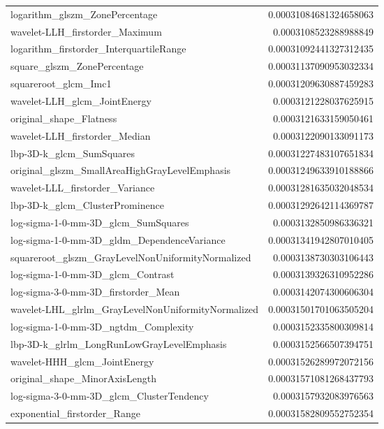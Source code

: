 {\begin{xltabular}[H]{\textwidth}{X r}
        logarithm\_glszm\_ZonePercentage & 0.00031084681324658063 \\
        wavelet-LLH\_firstorder\_Maximum & 0.0003108523288988849 \\
        logarithm\_firstorder\_InterquartileRange & 0.00031092441327312435 \\
        square\_glszm\_ZonePercentage & 0.00031137090953032334 \\
        squareroot\_glcm\_Imc1 & 0.00031209630887459283 \\
        wavelet-LLH\_glcm\_JointEnergy & 0.0003121228037625915 \\
        original\_shape\_Flatness & 0.0003121633159050461 \\
        wavelet-LLH\_firstorder\_Median & 0.0003122090133091173 \\
        lbp-3D-k\_glcm\_SumSquares & 0.00031227483107651834 \\
        original\_glszm\_SmallAreaHighGrayLevelEmphasis & 0.00031249633910188866 \\
        wavelet-LLL\_firstorder\_Variance & 0.00031281635032048534 \\
        lbp-3D-k\_glcm\_ClusterProminence & 0.00031292642114369787 \\
        log-sigma-1-0-mm-3D\_glcm\_SumSquares & 0.0003132850986336321 \\
        log-sigma-1-0-mm-3D\_gldm\_DependenceVariance & 0.00031341942807010405 \\
        squareroot\_glszm\_GrayLevelNonUniformityNormalized & 0.0003138730303106443 \\
        log-sigma-1-0-mm-3D\_glcm\_Contrast & 0.0003139326310952286 \\
        log-sigma-3-0-mm-3D\_firstorder\_Mean & 0.0003142074300606304 \\
        wavelet-LHL\_glrlm\_GrayLevelNonUniformityNormalized & 0.00031501701063505204 \\
        log-sigma-1-0-mm-3D\_ngtdm\_Complexity & 0.0003152335800309814 \\
        lbp-3D-k\_glrlm\_LongRunLowGrayLevelEmphasis & 0.0003152566507394751 \\
        wavelet-HHH\_glcm\_JointEnergy & 0.00031526289972072156 \\
        original\_shape\_MinorAxisLength & 0.00031571081268437793 \\
        log-sigma-3-0-mm-3D\_glcm\_ClusterTendency & 0.0003157932083976563 \\
        exponential\_firstorder\_Range & 0.00031582809552752354 \\

\end{xltabular}}
